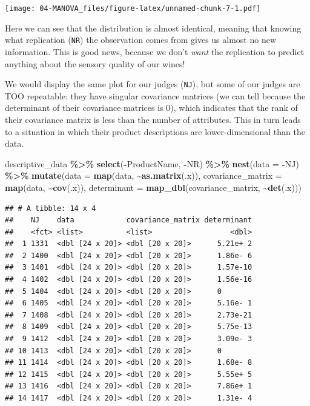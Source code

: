 \documentclass[
]{book}
\newenvironment{Shaded}{\begin{snugshade}}{\end{snugshade}}
\newcommand{\AttributeTok}[1]{\textcolor[rgb]{0.13,0.29,0.53}{#1}}
\newcommand{\FunctionTok}[1]{\textcolor[rgb]{0.13,0.29,0.53}{\textbf{#1}}}
\newcommand{\NormalTok}[1]{#1}
\newcommand{\SpecialCharTok}[1]{\textcolor[rgb]{0.81,0.36,0.00}{\textbf{#1}}}
\begin{document}
\texttt{[image: 04-MANOVA\_files/figure-latex/unnamed-chunk-7-1.pdf]}

Here we can see that the distribution is almost identical, meaning that knowing what replication (\texttt{NR}) the observation comes from gives us almost no new information. This is good news, because we don't \emph{want} the replication to predict anything about the sensory quality of our wines!

We would display the same plot for our judges (\texttt{NJ}), but some of our judges are TOO repeatable: they have singular covariance matrices (we can tell because the determinant of their covariance matrices is 0), which indicates that the rank of their covariance matrix is less than the number of attributes. This in turn leads to a situation in which their product descriptions are lower-dimensional than the data.

\begin{Shaded}
\begin{Highlighting}[]
\NormalTok{descriptive\_data }\SpecialCharTok{\%\textgreater{}\%}
  \FunctionTok{select}\NormalTok{(}\SpecialCharTok{{-}}\NormalTok{ProductName, }\SpecialCharTok{{-}}\NormalTok{NR) }\SpecialCharTok{\%\textgreater{}\%}
  \FunctionTok{nest}\NormalTok{(}\AttributeTok{data =} \SpecialCharTok{{-}}\NormalTok{NJ) }\SpecialCharTok{\%\textgreater{}\%}
  \FunctionTok{mutate}\NormalTok{(}\AttributeTok{data =} \FunctionTok{map}\NormalTok{(data, }\SpecialCharTok{\textasciitilde{}}\FunctionTok{as.matrix}\NormalTok{(.x)),}
         \AttributeTok{covariance\_matrix =} \FunctionTok{map}\NormalTok{(data, }\SpecialCharTok{\textasciitilde{}}\FunctionTok{cov}\NormalTok{(.x)),}
         \AttributeTok{determinant =} \FunctionTok{map\_dbl}\NormalTok{(covariance\_matrix, }\SpecialCharTok{\textasciitilde{}}\FunctionTok{det}\NormalTok{(.x)))}
\end{Highlighting}
\end{Shaded}

\begin{verbatim}
## # A tibble: 14 x 4
##    NJ    data            covariance_matrix determinant
##    <fct> <list>          <list>                  <dbl>
##  1 1331  <dbl [24 x 20]> <dbl [20 x 20]>      5.21e+ 2
##  2 1400  <dbl [24 x 20]> <dbl [20 x 20]>      1.86e- 6
##  3 1401  <dbl [24 x 20]> <dbl [20 x 20]>      1.57e-10
##  4 1402  <dbl [24 x 20]> <dbl [20 x 20]>      1.56e-16
##  5 1404  <dbl [24 x 20]> <dbl [20 x 20]>      0       
##  6 1405  <dbl [24 x 20]> <dbl [20 x 20]>      5.16e- 1
##  7 1408  <dbl [24 x 20]> <dbl [20 x 20]>      2.73e-21
##  8 1409  <dbl [24 x 20]> <dbl [20 x 20]>      5.75e-13
##  9 1412  <dbl [24 x 20]> <dbl [20 x 20]>      3.09e- 3
## 10 1413  <dbl [24 x 20]> <dbl [20 x 20]>      0       
## 11 1414  <dbl [24 x 20]> <dbl [20 x 20]>      1.68e- 8
## 12 1415  <dbl [24 x 20]> <dbl [20 x 20]>      5.55e+ 5
## 13 1416  <dbl [24 x 20]> <dbl [20 x 20]>      7.86e+ 1
## 14 1417  <dbl [24 x 20]> <dbl [20 x 20]>      1.31e- 4
\end{verbatim}
\end{document}
